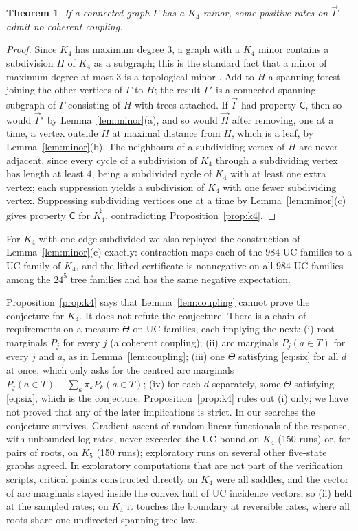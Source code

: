 \documentclass[11pt]{amsart}
\newtheorem{theorem}{Theorem}[section]
\theoremstyle{definition}
\theoremstyle{remark}
\begin{document}
\begin{theorem}\label{thm:minor}
If a connected graph $\Gamma$ has a $K_4$ minor, some positive rates on $\vec\Gamma$ admit no coherent coupling.
\end{theorem}

\begin{proof}
Since $K_4$ has maximum degree $3$, a graph with a $K_4$ minor contains a subdivision $H$ of $K_4$ as a subgraph; this is the standard fact that a minor of maximum degree at most $3$ is a topological minor \cite[Section~1.7]{Diestel2017}. Add to $H$ a spanning forest joining the other vertices of $\Gamma$ to $H$; the result $\Gamma'$ is a connected spanning subgraph of $\Gamma$ consisting of $H$ with trees attached. If $\vec\Gamma$ had property $\mathsf C$, then so would $\vec\Gamma'$ by Lemma~\ref{lem:minor}(a), and so would $\vec H$ after removing, one at a time, a vertex outside $H$ at maximal distance from $H$, which is a leaf, by Lemma~\ref{lem:minor}(b). The neighbours of a subdividing vertex of $H$ are never adjacent, since every cycle of a subdivision of $K_4$ through a subdividing vertex has length at least $4$, being a subdivided cycle of $K_4$ with at least one extra vertex; each suppression yields a subdivision of $K_4$ with one fewer subdividing vertex. Suppressing subdividing vertices one at a time by Lemma~\ref{lem:minor}(c) gives property $\mathsf C$ for $\vec K_4$, contradicting Proposition~\ref{prop:k4}.
\end{proof}

For $K_4$ with one edge subdivided we also replayed the construction of Lemma~\ref{lem:minor}(c) exactly: contraction maps each of the $984$ UC families to a UC family of $K_4$, and the lifted certificate is nonnegative on all $984$ UC families among the $24^5$ tree families and has the same negative expectation.

Proposition~\ref{prop:k4} says that Lemma~\ref{lem:coupling} cannot prove the conjecture for $K_4$. It does not refute the conjecture. There is a chain of requirements on a measure $\Theta$ on UC families, each implying the next: (i) root marginals $P_j$ for every $j$ (a coherent coupling); (ii) arc marginals $P_j(a\in T)$ for every $j$ and $a$, as in Lemma~\ref{lem:coupling}; (iii) one $\Theta$ satisfying \eqref{eq:six} for all $d$ at once, which only asks for the centred arc marginals $P_j(a\in T)-\sum_k\pi_kP_k(a\in T)$; (iv) for each $d$ separately, some $\Theta$ satisfying \eqref{eq:six}, which is the conjecture. Proposition~\ref{prop:k4} rules out (i) only; we have not proved that any of the later implications is strict. In our searches the conjecture survives. Gradient ascent of random linear functionals of the response, with unbounded log-rates, never exceeded the UC bound on $K_4$ (150 runs) or, for pairs of roots, on $K_5$ (150 runs); exploratory runs on several other five-state graphs agreed. In exploratory computations that are not part of the verification scripts, critical points constructed directly on $K_4$ were all saddles, and the vector of arc marginals stayed inside the convex hull of UC incidence vectors, so (ii) held at the sampled rates; on $K_4$ it touches the boundary at reversible rates, where all roots share one undirected spanning-tree law.
\end{document}
